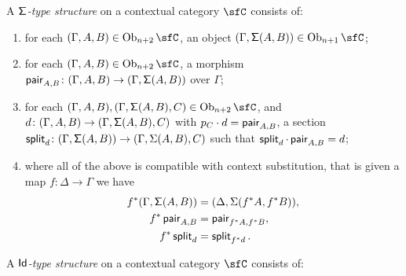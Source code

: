 \begin{defn}
  A \emph{$\operatorname{\mathsf{\Sigma}}$-type structure} on a contextual category $\sfC$ consists of:
  \begin{enumerate}
    \item for each $(\Gamma,A,B)\in\Ob_{n+2}\sfC$, an object
      $(\Gamma,\Sigmas(A,B))\in\Ob_{n+1}\sfC$;
    \item for each $(\Gamma,A,B)\in\Ob_{n+2}\sfC$, a morphism $\operatorname{\mathsf{pair}}_{A,B}\colon
      (\Gamma,A,B)\rightarrow(\Gamma,\operatorname{\mathsf{\Sigma}}(A,B))$ over $\Gamma$;
    \item for each $(\Gamma,A,B),(\Gamma,\Sigmas(A,B),C)\in\Ob_{n+2}\sfC$, and
      $d\colon(\Gamma,A,B)\rightarrow(\Gamma,\operatorname{\mathsf{\Sigma}}(A,B),C)$ with $p_C\cdot
      d=\operatorname{\mathsf{pair}}_{A,B}$, a section
      $\operatorname{\mathsf{split}}_d\colon(\Gamma,\operatorname{\mathsf{\Sigma}}(A,B))\rightarrow(\Gamma,\Sigma(A,B),C)$ such
      that $\operatorname{\mathsf{split}}_d\cdot\operatorname{\mathsf{pair}}_{A,B}=d$;
    \item where all of the above is compatible with context substitution, that
      is given a map $f\colon\Delta\rightarrow\Gamma$ we have
      \begin{align*}
        f^*(\Gamma,\operatorname{\mathsf{\Sigma}}(A,B)) &=(\Delta,\Sigma(f^*A,f^*B)), \\
        f^*\operatorname{\mathsf{pair}}_{A,B} &=\operatorname{\mathsf{pair}}_{f^*A,f^*B}, \\
        f^*\operatorname{\mathsf{split}}_d &=\operatorname{\mathsf{split}}_{f^*d}.
      \end{align*}
  \end{enumerate}
\end{defn}

\begin{defn}
  A \emph{$\operatorname{\mathsf{Id}}$-type structure} on a contextual category $\sfC$ consists of:
\end{defn}


